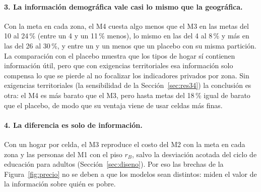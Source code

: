 \paragraph{3. La información demográfica vale casi lo mismo que la geográfica.}
Con la meta en cada zona, el M4 cuesta algo menos que el M3 en las metas del 10
al 24\,\% (entre un 4 y un 11\,\% menos), lo mismo en las del 4 al 8\,\% y más en
las del 26 al 30\,\%, y entre un \zPlacMin{} y un \zPlacMax{} menos que un placebo con su
misma partición. La comparación con el placebo muestra que los tipos de
hogar sí contienen información útil, pero que con exigencias territoriales esa
información solo compensa lo que se pierde al no focalizar los indicadores
privados por zona. Sin exigencias territoriales (la sensibilidad de la
Sección~\ref{sec:res34}) la conclusión es otra: el M4 es más barato que el M3,
pero hasta metas del 18\,\% igual de barato que el placebo, de modo que su
ventaja viene de usar celdas más finas.

\paragraph{4. La diferencia es solo de información.} Con un hogar por celda, el
M3 reproduce el costo del M2 con la meta en cada zona y las personas del M1 con
el piso $r_B$, salvo la desviación acotada del ciclo de educación para adultos
(Sección~\ref{sec:diseno}). Por eso las brechas de la Figura~\ref{fig:precio} no
se deben a que los modelos sean distintos: miden el valor de la información
sobre quién es pobre.
